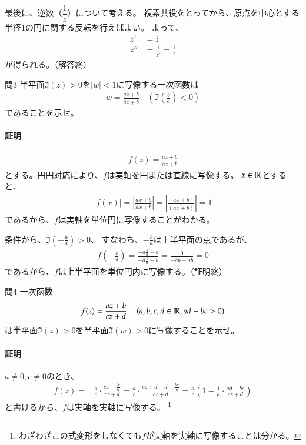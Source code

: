 最後に、逆数（$\dfrac{1}{z}$）について考える。
複素共役をとってから、原点を中心とする半径1の円に関する反転を行えばよい。
よって、
\begin{align*}
    z'&=\overline{z}\\
    z''&=\frac{1}{\overline{z'}}=\frac{1}{z}
\end{align*}
が得られる。（解答終）



\newpage
\begin{mysimplebox}{問3}
    半平面$\Im(z)>0$を$|w|<1$に写像する一次函数は
    \begin{align*}
        w=\frac{az+b}{\overline{a}z+\overline{b}}
        \quad\left(\Im\left(\frac{b}{a}\right)<0\right)
    \end{align*}
    であることを示せ。
\end{mysimplebox}
\paragraph{証明}
\begin{align*}
    f(z)=\frac{az+b}{\overline{a}z+\overline{b}}
\end{align*}
とする。円円対応により、$f$は実軸を円または直線に写像する。
$x\in\mathbb{R}$とすると、
\begin{align*}
    \left|f(x)\right|
    =\left|\frac{ax+b}{\overline{a}x+\overline{b}}\right|
    =\left|\frac{ax+b}{\overline{(ax+b)}}\right|
    =1
\end{align*}
であるから、$f$は実軸を単位円に写像することがわかる。

条件から、$\Im\left(-\frac{b}{a}\right)>0$、
すなわち、$-\frac{b}{a}$は上半平面の点であるが、
\begin{align*}
    f\left(-\frac{b}{a}\right)
    =\frac{-a\frac{b}{a}+b}{-\overline{a}\frac{b}{a}+\overline{b}}
    =\frac{0}{-\overline{a}b+a\overline{b}}
    =0
\end{align*}
であるから、$f$は上半平面を単位円内に写像する。（証明終）

\newpage
\begin{mysimplebox}{問4}
    一次函数
    \begin{align*}
        f(z)=\frac{az+b}{cz+d}
        \quad\left(a,b,c,d\in\mathbb{R},ad-bc>0\right)
    \end{align*}
    は半平面$\Im(z)>0$を半平面$\Im(w)>0$に写像することを示せ。
\end{mysimplebox}
\paragraph{証明}
$a\neq0,c\neq0$のとき、
\begin{align*}
    f(z)=&\frac{a}{c}\cdot\frac{cz+\frac{bc}{a}}{cz+d}
    =\frac{a}{c}\cdot\frac{cz+d-d+\frac{bc}{a}}{cz+d}
    =\frac{a}{c}\left(1-\frac{1}{a}\cdot\frac{ad-bc}{cz+d}\right)
\end{align*}
と書けるから、$f$は実軸を実軸に写像する。
\footnote{わざわざこの式変形をしなくても$f$が実軸を実軸に写像することは分かる。}

